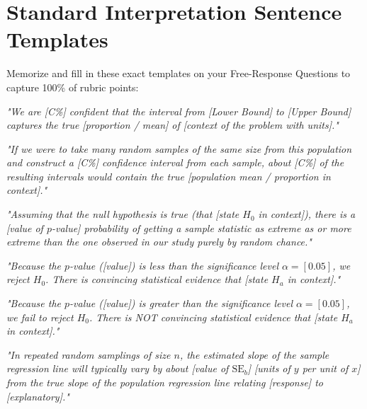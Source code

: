 \chapter{Standard Interpretation Sentence Templates}

Memorize and fill in these exact templates on your Free-Response Questions to capture 100\% of rubric points:

\begin{templatebox}
\emph{"We are [C\%] confident that the interval from [Lower Bound] to [Upper Bound] captures the true [proportion / mean] of [context of the problem with units]."}
\end{templatebox}

\begin{templatebox}
\emph{"If we were to take many random samples of the same size from this population and construct a [C\%] confidence interval from each sample, about [C\%] of the resulting intervals would contain the true [population mean / proportion in context]."}
\end{templatebox}

\begin{templatebox}
\emph{"Assuming that the null hypothesis is true (that [state $H_0$ in context]), there is a [value of $p$-value] probability of getting a sample statistic as extreme as or more extreme than the one observed in our study purely by random chance."}
\end{templatebox}

\begin{templatebox}
\emph{"Because the $p$-value ([value]) is less than the significance level $\alpha = [0.05]$, we reject $H_0$. There is convincing statistical evidence that [state $H_a$ in context]."}
\end{templatebox}

\begin{templatebox}
\emph{"Because the $p$-value ([value]) is greater than the significance level $\alpha = [0.05]$, we fail to reject $H_0$. There is NOT convincing statistical evidence that [state $H_a$ in context]."}
\end{templatebox}

\begin{templatebox}
\emph{"In repeated random samplings of size $n$, the estimated slope of the sample regression line will typically vary by about [value of $\text{SE}_b$] [units of $y$ per unit of $x$] from the true slope of the population regression line relating [response] to [explanatory]."}
\end{templatebox}

